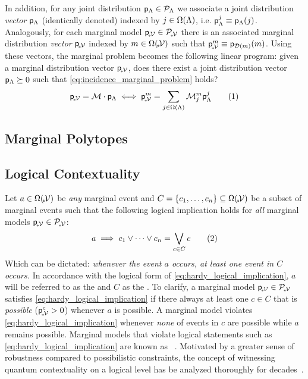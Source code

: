 \documentclass[aps, 10pt, english, twoside, twocolumn, pra, nofootinbib, tightenlines, longbibliography, superscriptaddress]{revtex4-1}
\begin{document}
    In addition, for any joint distribution ${\mathsf{p}}_{\Lambda} \in \mathcal{P}_{\Lambda}$ we associate a joint distribution \textit{vector} ${\mathsf{p}}_{\Lambda}$ (identically denoted) indexed by $j \in \events{\jointvar}$, i.e. $\prob{\jointvar}^{j} \defined \prob{\jointvar}\br{j}$. Analogously, for each marginal model ${\mathsf{p}}_{\!{}_*\!\mathcal{V}} \in \mathcal{P}_{\!{}_*\!\mathcal{V}}$ there is an associated marginal distribution \textit{vector} ${\mathsf{p}}_{\!{}_*\!\mathcal{V}}$ indexed by $m \in \events{\mscenariowrap}$ such that $\prob{\mscenariowrap}^{m} \defined \prob{\domain{m}}\br{m}$. Using these vectors, the marginal problem becomes the following linear program: given a marginal distribution vector ${\mathsf{p}}_{\!{}_*\!\mathcal{V}}$, does there exist a joint distribution vector ${\mathsf{p}}_{\Lambda} \succeq 0$ such that \cref{eq:incidence_marginal_problem} holds?
    \[ \prob{\mscenariowrap} = \incidence \cdot \prob{\jointvar} \iff \prob{\mscenariowrap}^{m} = \sum_{j \in \events{\jointvar}} \incidence^{m}_{j} \prob{\jointvar}^{j} \eq \label{eq:incidence_marginal_problem} \]

    \subsection{Marginal Polytopes}

    \subsection{Logical Contextuality}
    Let $a \in \events{\mscenariowrap}$ be \textit{any} marginal event and $C = \bc{c_1, \ldots, c_n} \subseteq \events{\mscenariowrap}$ be a subset of marginal events such that the following logical implication holds for \textit{all} marginal models ${\mathsf{p}}_{\!{}_*\!\mathcal{V}} \in \mathcal{P}_{\!{}_*\!\mathcal{V}}$:
    \[ a \implies c_1 \vee \cdots \vee c_n = \bigvee_{c \in C} c \eq \label{eq:hardy_logical_implication} \]
    Which can be dictated: \textit{whenever the event $a$ occurs, at least one event in $C$ occurs.} In accordance with the logical form of \cref{eq:hardy_logical_implication}, $a$ will be referred to as the  and $C$ as the . To clarify, a marginal model ${\mathsf{p}}_{\!{}_*\!\mathcal{V}} \in \mathcal{P}_{\!{}_*\!\mathcal{V}}$ satisfies \cref{eq:hardy_logical_implication} if there always at least one $c \in C$ that is \textit{possible} (${\mathsf{p}}_{\!{}_*\!\mathcal{V}}^{c} > 0$) whenever $a$ is possible. A marginal model violates \cref{eq:hardy_logical_implication} whenever \textit{none} of events in $c$ are possible while $a$ remains possible. Marginal models that violate logical statements such as \cref{eq:hardy_logical_implication} are known as ~\cite{Inflation,Mansfield_2012,Mancinska_2014}. Motivated by a greater sense of robustness compared to possibilistic constraints, the concept of witnessing quantum contextuality on a logical level has be analyzed thoroughly for decades~\cite{Abramsky_2012,Greenberger_1990}.
\end{document}
